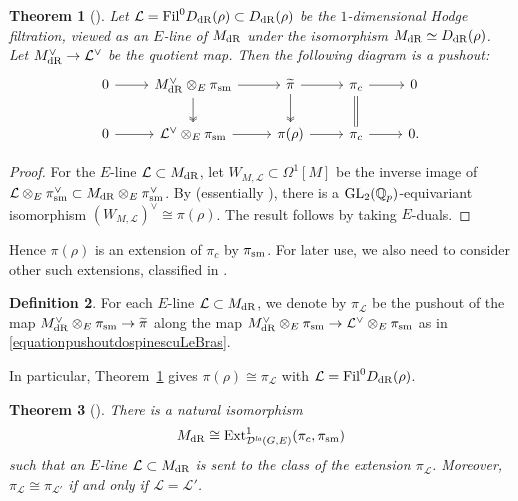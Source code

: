 \documentclass[a4paper,10pt]{amsart}
\newtheorem{theorem}{Theorem}[section]
\theoremstyle{remark}
\theoremstyle{definition}
\newtheorem{definition}[theorem]{Definition}
\theoremstyle{plain}
\numberwithin{equation}{section}
\newcommand{\bbQ}{{\mathbb Q}}
\newcommand{\calD}{{\mathcal D}}
\newcommand{\calL}{{\mathcal L}}
\newcommand{\dR}{{\rm dR}}
\newcommand{\Ext}{{\rm Ext}}
\newcommand{\Fil}{{\rm Fil}}
\newcommand{\GL}{{\rm GL}}
\newcommand{\la}{{\it la}}
\newcommand{\sm}{{\rm sm}}
\begin{document}
\begin{theorem}[{\cite[Thm.~1.2 \& Thm.~1.4]{dospinescuLeBras2017revetements}}]\label{theoremdospinescuLeBras}
	Let $\calL=\Fil^{0}D_{\rm dR}(\rho)\subset D_{\dR}(\rho)$ be the $1$-dimensional Hodge filtration, viewed as an $E$-line of $M_{\rm dR}$ under the isomorphism $M_{\rm dR}\simeq D_{\rm dR}(\rho)$. Let $ M_{\rm dR}^{\vee}\rightarrow \calL^{\vee}$ be the quotient map. 	Then the following diagram is a pushout:
	\begin{equation}\label{equationpushoutdospinescuLeBras}
		\begin{tikzcd}0 \arrow[r] & M_{\rm dR}^{\vee}\otimes_E\pi_{\sm} \arrow[r] \arrow[d, two heads] & \widetilde{\pi} \arrow[r] \arrow[d, two heads] & \pi_c \arrow[r] \arrow[d, equal] & 0 \\
			0 \arrow[r] & \calL^{\vee}\otimes_E\pi_{\sm} \arrow[r] & \pi(\rho) \arrow[r] & \pi_c \arrow[r] & 0.
		\end{tikzcd}
	\end{equation}
\end{theorem}
\begin{proof}
	For the $E$-line $\calL\subset M_{\rm dR}$, let $W_{M,\calL}\subset\Omega^1[M]$ be the inverse image of $\calL\otimes_E\pi_{\sm}^{\vee}\subset M_{\dR}\otimes_E\pi_{\sm}^{\vee}$. By \cite[Prop.~2.9]{colmezDospinescuNiziol2020} (essentially \cite[Thm.~1.4]{dospinescuLeBras2017revetements}), there is a $\GL_2(\bbQ_p)$-equivariant isomorphism $(W_{M,\calL})^{\vee}\cong\pi(\rho)$. The result follows by taking $E$-duals.
\end{proof}
Hence $\pi(\rho)$ is an extension of $\pi_c$ by $\pi_{\rm sm}$. For later use, we also need to consider other such extensions, classified in \cite{ding2022Ext1}. 
\begin{definition}\label{definitionpiL}
	For each $E$-line $\calL\subset M_{\rm dR}$, we denote by $\pi_{\calL}$ be the pushout of the map $M_{\rm dR}^{\vee}\otimes_E\pi_{\sm}\rightarrow \widetilde{\pi}$ along the map $M_{\rm dR}^{\vee}\otimes_E\pi_{\sm}\rightarrow \calL^{\vee}\otimes_E\pi_{\sm}$ as in \eqref{equationpushoutdospinescuLeBras}. 
\end{definition}
In particular, Theorem~\ref{theoremdospinescuLeBras} gives $\pi(\rho)\cong \pi_{\mathcal{L}}$ with $\mathcal{L}=\Fil^{0} D_{\dR}(\rho)$.	
\begin{theorem}[{\cite[Thm.~2.5]{ding2022Ext1}}]\label{theoremDingext1}
	There is a natural isomorphism 
	\[M_{\dR}\cong \Ext^1_{\calD^{\la}(G,E)}(\pi_c,\pi_{\sm})\] 
	such that an $E$-line $\calL\subset M_{\dR}$ is sent to the class of the extension $\pi_{\calL}$. Moreover, $\pi_{\calL}\cong\pi_{\calL'}$ if and only if $\calL=\calL'$.
\end{theorem}
\end{document}
